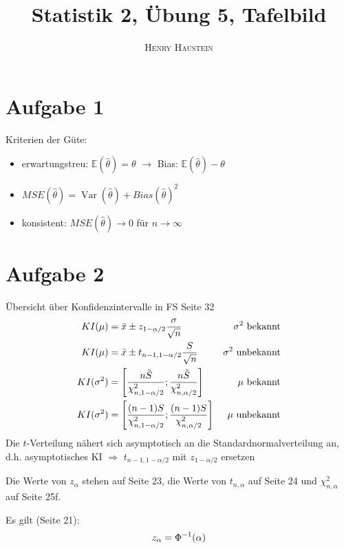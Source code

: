 \documentclass{article}
\title{\textbf{Statistik 2, Übung 5, Tafelbild}}
\author{\textsc{Henry Haustein}}
\date{}
\DeclareMathOperator{\Var}{Var}
\newcommand{\E}{\mathbb{E}}
\begin{document}
	\maketitle
	
	\section*{Aufgabe 1}
	Kriterien der Güte:
	\begin{itemize}
		\item erwartungstreu: $\E(\hat{\theta}) = \theta$ $\to$ Bias: $\E(\hat{\theta}) - \theta$
		\item $MSE(\hat{\theta}) = \Var(\hat{\theta}) + Bias(\hat{\theta})^2$
		\item konsistent: $MSE(\hat{\theta})\to 0$ für $n\to\infty$
	\end{itemize}

	\section*{Aufgabe 2}
	Übersicht über Konfidenzintervalle in FS Seite 32
	\begin{align}
		KI(\mu) &= \bar{x} \pm z_{1-\alpha/2}\frac{\sigma}{\sqrt{n}} &\sigma^2\text{ bekannt} \notag \\
		KI(\mu) &= \bar{x} \pm t_{n-1,1-\alpha/2}\frac{S}{\sqrt{n}} &\sigma^2\text{ unbekannt} \notag \\
		KI(\sigma^2) &= \left[\frac{n\tilde{S}}{\chi^2_{n,1-\alpha/2}}; \frac{n\tilde{S}}{\chi^2_{n,\alpha/2}}\right] &\mu\text{ bekannt} \notag \\
		KI(\sigma^2) &= \left[\frac{(n-1)S}{\chi^2_{n,1-\alpha/2}}; \frac{(n-1)S}{\chi^2_{n,\alpha/2}}\right] &\mu\text{ unbekannt} \notag
	\end{align}
	Die $t$-Verteilung nähert sich asymptotisch an die Standardnormalverteilung an, d.h. asymptotisches KI $\Rightarrow$ $t_{n-1,1-\alpha/2}$ mit $z_{1-\alpha/2}$ ersetzen
	
	Die Werte von $z_\alpha$ stehen auf Seite 23, die Werte von $t_{n,\alpha}$ auf Seite 24 und $\chi^2_{n,\alpha}$ auf Seite 25f.
	
	Es gilt (Seite 21):
	\begin{align}
		z_\alpha = \Phi^{-1}(\alpha) \notag
	\end{align}
	
\end{document}
